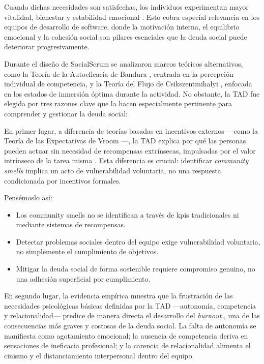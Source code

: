 Cuando dichas necesidades son satisfechas, los individuos experimentan mayor vitalidad, bienestar y estabilidad emocional \cite{ryan_self-determination_2000}. Esto cobra especial relevancia en los equipos de desarrollo de software, donde la motivación interna, el equilibrio emocional y la cohesión social son pilares esenciales que la deuda social puede deteriorar progresivamente.

Durante el diseño de SocialScrum se analizaron marcos teóricos alternativos, como la Teoría de la Autoeficacia de Bandura \cite{bandura1997self}, centrada en la percepción individual de competencia, y la Teoría del Flujo de Csikszentmihalyi \cite{csikszentmihalyi1990flow}, enfocada en los estados de inmersión óptima durante la actividad.
No obstante, la TAD fue elegida por tres razones clave que la hacen especialmente pertinente para comprender y gestionar la deuda social:

En primer lugar, a diferencia de teorías basadas en incentivos externos —como la Teoría de las Expectativas de Vroom \cite{vroom1964work}—, la TAD explica por qué las personas pueden actuar sin necesidad de recompensas extrínsecas, impulsadas por el valor intrínseco de la tarea misma \cite{ryan_self-determination_2000}.
Esta diferencia es crucial: identificar \textit{community smells} implica un acto de vulnerabilidad voluntaria, no una respuesta condicionada por incentivos formales.

Pensémoslo así:

\begin{itemize}
    \item Los community smells no se identifican a través de \acrfull{kpis} tradicionales ni mediante sistemas de recompensas.
    \item Detectar problemas sociales dentro del equipo exige vulnerabilidad voluntaria, no simplemente el cumplimiento de objetivos.
    \item Mitigar la deuda social de forma sostenible requiere compromiso genuino, no una adhesión superficial por cumplimiento.
\end{itemize}

En segundo lugar, la evidencia empírica muestra que la frustración de las necesidades psicológicas básicas definidas por la TAD —autonomía, competencia y relacionalidad— predice de manera directa el desarrollo del \textit{burnout} \cite{tulili2022burnout}, una de las consecuencias más graves y costosas de la deuda social.
La falta de autonomía se manifiesta como agotamiento emocional; la ausencia de competencia deriva en sensaciones de ineficacia profesional; y la carencia de relacionalidad alimenta el cinismo y el distanciamiento interpersonal dentro del equipo.

